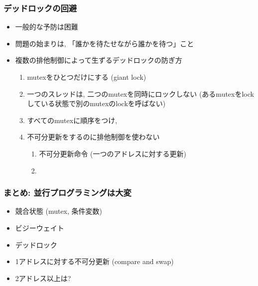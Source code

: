 \documentclass[12pt,dvipdfmx]{beamer}
\begin{document}
\begin{frame}
  \frametitle{デッドロックの回避}
  \begin{itemize}
  \item 一般的な予防は困難
  \item 問題の始まりは, 「誰かを待たせながら誰かを待つ」こと
  \item 複数の排他制御によって生ずるデッドロックの防ぎ方
    \begin{enumerate}
    \item mutexをひとつだけにする (giant lock)
    \item 一つのスレッドは,
      二つのmutexを同時にロックしない
      (あるmutexをlockしている状態で別のmutexのlockを呼ばない)
    \item すべてのmutexに順序をつけ,
    \item 不可分更新をするのに排他制御を使わない
      \begin{enumerate}
      \item 不可分更新命令 (一つのアドレスに対する更新)
      \item {}
      \end{enumerate}
    \end{enumerate}
  \end{itemize}
\end{frame}

\begin{frame}
  \frametitle{まとめ: 並行プログラミングは大変}
  \begin{itemize}
  \item 競合状態 (mutex, 条件変数)
  \item ビジーウェイト
  \item デッドロック
  \item 1アドレスに対する不可分更新 (compare and swap)
  \item 2アドレス以上は?
  \end{itemize}
\end{frame}
\end{document}
